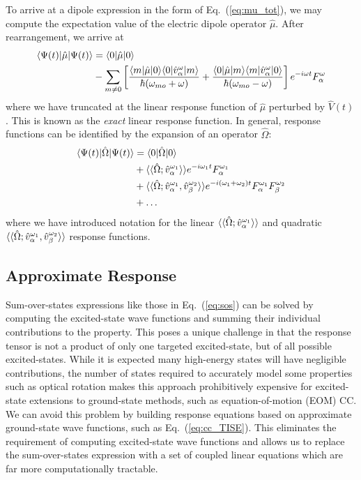 {{To arrive at a dipole expression in the form of Eq.~(\ref{eq:mu_tot}), we may compute the expectation 
value of the electric dipole operator $\hat{\mu}$. After rearrangement, we arrive at
\begin{equation} \label{eq:sos}
    \begin{aligned}
    \langle\Psi(t) |\hat\mu| \Psi(t) \rangle &= \langle0 |\hat\mu| 0 \rangle \\ 
    &- \sum_{m\neq0}\left[\frac{\langle m |\hat\mu| 0 \rangle\langle0 |\hat{v}^\omega_\alpha| m \rangle}{\hbar(\omega_{mo}+\omega)}
        + \frac{\langle0 |\hat\mu| m \rangle\langle m |\hat{v}^\omega_\alpha| 0 \rangle}{\hbar(\omega_{mo}-\omega)}\right]
    e^{-i\omega t}F^\omega_\alpha
    \end{aligned}
\end{equation}
where we have truncated at the linear response function of $\hat{\mu}$ perturbed by $\hat{V}(t)$. This is known as the \textit{exact} linear response function. In general, 
response functions can be identified by the expansion of an operator $\hat\Omega$:
\begin{equation}
    \begin{aligned}
    \langle\Psi(t) |\hat\Omega| \Psi(t) \rangle &= \langle0 |\hat\Omega| 0 \rangle \\ 
    &+ \langle\langle\hat\Omega;\hat{v}^{\omega_1}_\alpha\rangle\rangle e^{-i\omega_1 t}F^{\omega_1}_\alpha \\ 
    &+ \langle\langle\hat\Omega;\hat{v}^{\omega_1}_\alpha,\hat{v}^{\omega_2}_\beta\rangle\rangle e^{-i(\omega_1+\omega_2)t}F^{\omega_1}_\alpha F^{\omega_2}_\beta \\
    &+ \ldots
    \end{aligned}
\end{equation}
where we have introduced notation for the linear $\langle\langle\hat\Omega;\hat{v}^{\omega_1}_\alpha\rangle\rangle$ 
and quadratic $\langle\langle\hat\Omega;\hat{v}^{\omega_1}_\alpha,\hat{v}^{\omega_2}_\beta\rangle\rangle$ response functions.

\subsection{Approximate Response} \label{ss:apprx} Sum-over-states expressions
like those in Eq.~(\ref{eq:sos}) can be solved by computing the excited-state
wave functions and summing their individual contributions to the property. This
poses a unique challenge in that the response tensor is not a product of only
one targeted excited-state, but of all possible excited-states. While it is
expected many high-energy states will have negligible contributions, the number
of states required to accurately model some properties such as optical rotation
makes this approach prohibitively expensive for excited-state extensions to
ground-state methods, such as equation-of-motion (EOM) CC.\cite{Wiberg2006}  
We can avoid this
problem by building response equations based on approximate ground-state wave
functions, such as Eq.~(\ref{eq:cc_TISE}). This eliminates the requirement of 
computing excited-state wave functions and allows us to replace the
sum-over-states expression with a set of coupled linear equations which are far
more computationally tractable.\cite{Norman2011,Helgaker2012}

}}
